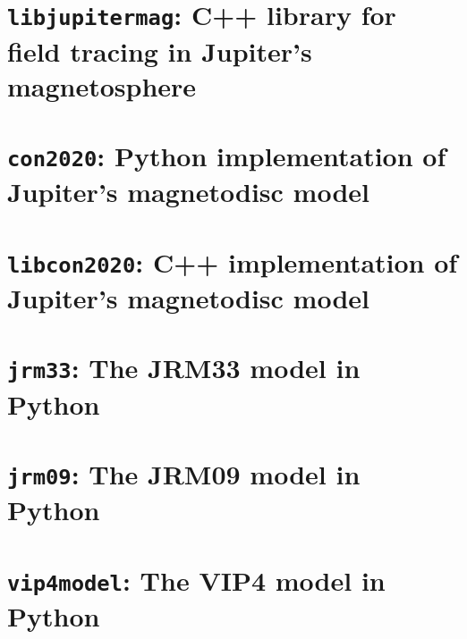 	\section{\texttt{libjupitermag}: C++ library for field tracing in Jupiter's magnetosphere}

	\section{\texttt{con2020}: Python implementation of Jupiter's magnetodisc model}

	\section{\texttt{libcon2020}: C++ implementation of Jupiter's magnetodisc model}

	\section{\texttt{jrm33}: The JRM33 model in Python}

	\section{\texttt{jrm09}: The JRM09 model in Python}

	\section{\texttt{vip4model}: The VIP4 model in Python}
	